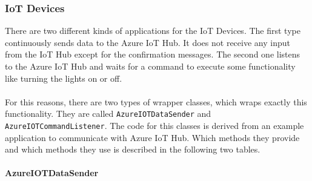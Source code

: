 \documentclass[a4paper]{article}
\begin{document}
			\subsubsection{IoT Devices}
			There are two different kinds of applications for the IoT Devices.
			The first type continuously sends data to the Azure IoT Hub.
			It does not receive any input from the IoT Hub except for the confirmation messages.
			The second one listens to the Azure IoT Hub and waits for a command to execute some functionality like turning the lights on or off.\\
			\\
			For this reasons, there are two types of wrapper classes, which wraps exactly this functionality.
			They are called \texttt{AzureIOTDataSender} and \texttt{AzureIOTCommandListener}.
			The code for this classes is derived from an example application to communicate with Azure IoT Hub.			
			Which methods they provide and which methods they use is described in the following two tables.
			
				\paragraph{AzureIOTDataSender}
				
\end{document}
